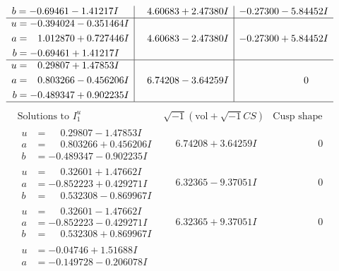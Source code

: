 \documentclass[1p]{elsarticle_modified}
\theoremstyle{definition}
\newcommand{\I}{\sqrt{-1}}
\begin{document}
$$\begin{array}{c|c|c}
\begin{aligned}
b &= -0.69461 - 1.41217 I\end{aligned}
 & \phantom{-}4.60683 + 2.47380 I & -0.27300 - 5.84452 I \\ \hline\begin{aligned}
u &= -0.394024 - 0.351464 I \\
a &= \phantom{-}1.012870 + 0.727446 I \\
b &= -0.69461 + 1.41217 I\end{aligned}
 & \phantom{-}4.60683 - 2.47380 I & -0.27300 + 5.84452 I \\ \hline\begin{aligned}
u &= \phantom{-}0.29807 + 1.47853 I \\
a &= \phantom{-}0.803266 - 0.456206 I \\
b &= -0.489347 + 0.902235 I\end{aligned}
 & \phantom{-}6.74208 - 3.64259 I & \phantom{-0.000000 } 0\\
 \hline 
 \end{array}$$\newpage$$\begin{array}{c|c|c}  
\text{Solutions to }I^u_{1}& \I (\text{vol} + \sqrt{-1}CS) & \text{Cusp shape}\\
 \hline 
\begin{aligned}
u &= \phantom{-}0.29807 - 1.47853 I \\
a &= \phantom{-}0.803266 + 0.456206 I \\
b &= -0.489347 - 0.902235 I\end{aligned}
 & \phantom{-}6.74208 + 3.64259 I & \phantom{-0.000000 } 0 \\ \hline\begin{aligned}
u &= \phantom{-}0.32601 + 1.47662 I \\
a &= -0.852223 + 0.429271 I \\
b &= \phantom{-}0.532308 - 0.869967 I\end{aligned}
 & \phantom{-}6.32365 - 9.37051 I & \phantom{-0.000000 } 0 \\ \hline\begin{aligned}
u &= \phantom{-}0.32601 - 1.47662 I \\
a &= -0.852223 - 0.429271 I \\
b &= \phantom{-}0.532308 + 0.869967 I\end{aligned}
 & \phantom{-}6.32365 + 9.37051 I & \phantom{-0.000000 } 0 \\ \hline\begin{aligned}
u &= -0.04746 + 1.51688 I \\
a &= -0.149728 - 0.206078 I \\

\end{aligned}
\end{array}$$
\end{document}
